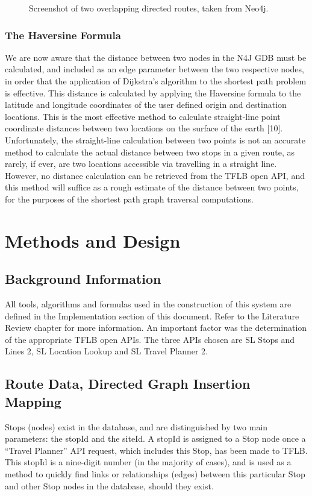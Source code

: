 \documentclass[12pt]{article}   	%
\begin{document}
\newpage

\hfill
\begin{figure}[htp]

\hfill
\caption{Screenshot of two overlapping directed routes, taken from Neo4j.}
\end{figure}

\newpage

\subsubsection{The Haversine Formula}
We are now aware that the distance between two nodes in the N4J GDB must be calculated, and included as an edge parameter between the two respective nodes, in order that the application of Dijkstra’s algorithm to the shortest path problem is effective. This distance is calculated by applying the Haversine formula to the latitude and longitude coordinates of the user defined origin and destination locations. This is the most effective method to calculate straight-line point coordinate distances between two locations on the surface of the earth [10]. Unfortunately, the straight-line calculation between two points is not an accurate method to calculate the actual distance between two stops in a given route, as rarely, if ever, are two locations accessible via travelling in a straight line. However, no distance calculation can be retrieved from the TFLB open API, and this method will suffice as a rough estimate of the distance between two points, for the purposes of the shortest path graph traversal computations.

\newpage

\section{Methods and Design}
\subsection{Background Information}
All tools, algorithms and formulas used in the construction of this system are defined in the Implementation section of this document. Refer to the Literature Review chapter for more information. An important factor was the determination of the appropriate TFLB open APIs. The three APIs chosen are SL Stops and Lines 2, SL Location Lookup and SL Travel Planner 2.

\subsection{Route Data, Directed Graph Insertion Mapping}
Stops (nodes) exist in the database, and are distinguished by two main parameters: the stopId and the siteId. A stopId is assigned to a Stop node once a “Travel Planner” API request, which includes this Stop, has been made to TFLB. This stopId is a nine-digit number (in the majority of cases), and is used as a method to quickly find links or relationships (edges) between this particular Stop and other Stop nodes in the database, should they exist.
\end{document}
